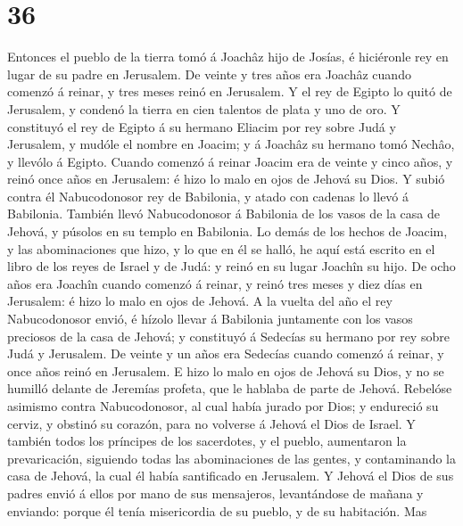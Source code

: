 \hypertarget{section-35}{%
\section{36}\label{section-35}}

 Entonces el pueblo de la tierra tomó á Joachâz hijo de
Josías, é hiciéronle rey en lugar de su padre en Jerusalem.
 De veinte y tres años era Joachâz cuando comenzó á
reinar, y tres meses reinó en Jerusalem.  Y el rey de
Egipto lo quitó de Jerusalem, y condenó la tierra en cien talentos de
plata y uno de oro.  Y constituyó el rey de Egipto á su
hermano Eliacim por rey sobre Judá y Jerusalem, y mudóle el nombre en
Joacim; y á Joachâz su hermano tomó Nechâo, y llevólo á Egipto.
 Cuando comenzó á reinar Joacim era de veinte y cinco
años, y reinó once años en Jerusalem: é hizo lo malo en ojos de Jehová
su Dios.  Y subió contra él Nabucodonosor rey de
Babilonia, y atado con cadenas lo llevó á Babilonia. 
También llevó Nabucodonosor á Babilonia de los vasos de la casa de
Jehová, y púsolos en su templo en Babilonia.  Lo demás de
los hechos de Joacim, y las abominaciones que hizo, y lo que en él se
halló, he aquí está escrito en el libro de los reyes de Israel y de
Judá: y reinó en su lugar Joachîn su hijo.  De ocho años
era Joachîn cuando comenzó á reinar, y reinó tres meses y diez días en
Jerusalem: é hizo lo malo en ojos de Jehová.  A la vuelta
del año el rey Nabucodonosor envió, é hízolo llevar á Babilonia
juntamente con los vasos preciosos de la casa de Jehová; y constituyó á
Sedecías su hermano por rey sobre Judá y Jerusalem.  De
veinte y un años era Sedecías cuando comenzó á reinar, y once años reinó
en Jerusalem.  E hizo lo malo en ojos de Jehová su Dios,
y no se humilló delante de Jeremías profeta, que le hablaba de parte de
Jehová.  Rebelóse asimismo contra Nabucodonosor, al cual
había jurado por Dios; y endureció su cerviz, y obstinó su corazón, para
no volverse á Jehová el Dios de Israel.  Y también todos
los príncipes de los sacerdotes, y el pueblo, aumentaron la
prevaricación, siguiendo todas las abominaciones de las gentes, y
contaminando la casa de Jehová, la cual él había santificado en
Jerusalem.  Y Jehová el Dios de sus padres envió á ellos
por mano de sus mensajeros, levantándose de mañana y enviando: porque él
tenía misericordia de su pueblo, y de su habitación.  Mas
